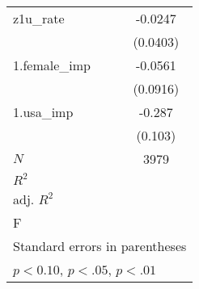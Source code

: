 {\begin{tabular}{l*{1}{c}}
z1u\_rate    &     -0.0247         \\
            &    (0.0403)         \\
[1em]
1.female\_imp&     -0.0561         \\
            &    (0.0916)         \\
[1em]
1.usa\_imp   &      -0.287\sym{***}\\
            &     (0.103)         \\
\hline
\(N\)       &        3979         \\
\(R^{2}\)   &                     \\
adj. \(R^{2}\)&                     \\
F           &                     \\
\hline\hline
\multicolumn{2}{l}{\footnotesize Standard errors in parentheses}\\
\multicolumn{2}{l}{\footnotesize \sym{*} \(p<0.10\), \sym{**} \(p<.05\), \sym{***} \(p<.01\)}\\
\end{tabular}
}
